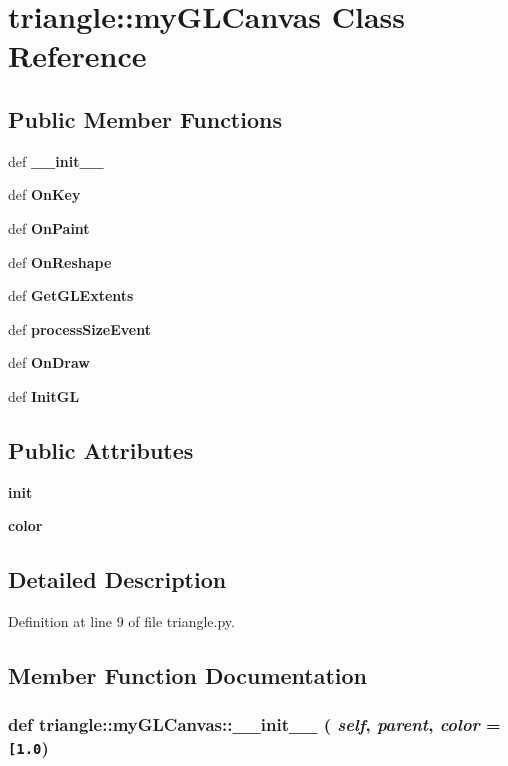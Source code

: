\section{triangle::myGLCanvas Class Reference}
\label{classtriangle_1_1myGLCanvas}
\subsection*{Public Member Functions}
\begin{CompactItemize}
\item 
def {\bf \_\-\_\-init\_\-\_\-}
\item 
def {\bf OnKey}
\item 
def {\bf OnPaint}
\item 
def {\bf OnReshape}
\item 
def {\bf GetGLExtents}
\item 
def {\bf processSizeEvent}
\item 
def {\bf OnDraw}
\item 
def {\bf InitGL}
\end{CompactItemize}
\subsection*{Public Attributes}
\begin{CompactItemize}
\item 
{\bf init}
\item 
{\bf color}
\end{CompactItemize}


\subsection{Detailed Description}


Definition at line 9 of file triangle.py.

\subsection{Member Function Documentation}
\subsubsection{\setlength{\rightskip}{0pt plus 5cm}def triangle::myGLCanvas::\_\-\_\-init\_\-\_\- ( {\em self},  {\em parent},  {\em color} = {\tt [1.0})}\label{classtriangle_1_1myGLCanvas_2b68333c4a6af03b04bdd348fa34821b}




